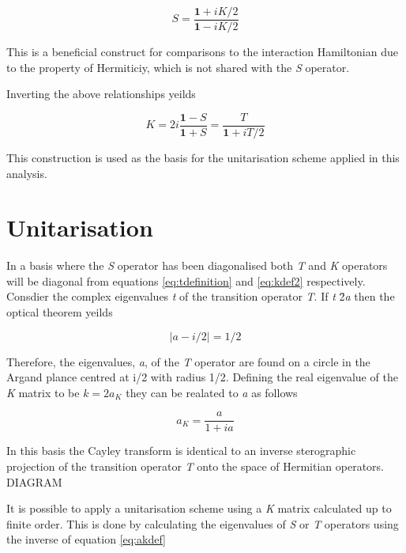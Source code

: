 \begin{equation}
  S = \frac{\textbf{1} + iK/2}{\textbf{1} - iK/2} 
  \label{eq:kdef}
\end{equation}

This is a beneficial construct for comparisons to the interaction Hamiltonian due to the property of Hermiticiy, which is not shared with the \textit{S} operator.

Inverting the above relationships yeilds

\begin{equation}
  K = 2i \frac{\textbf{1} - S}{\textbf{1} + S} = \frac{T}{\textbf{1} + iT/2}
  \label{eq:kdef2}
\end{equation}

This construction is used as the basis for the unitarisation scheme applied in this analysis.  

\section{Unitarisation}
\label{sec:unitarisation}

In a basis where the \textit{S} operator has been diagonalised both \textit{T} and \textit{K} operators will be diagonal from equations \ref{eq:tdefinition} and \ref{eq:kdef2} respectively.  Consdier the complex eigenvalues \textit{t} of the transition operator \textit{T}.  If \textit{t} \= 2\textit{a} then the optical theorem yeilds

\begin{equation}
  |a - i/2| = 1/2
  \label{eq:toperatoreval}
\end{equation}

Therefore, the eigenvalues, \textit{a}, of the \textit{T} operator are found on a circle in the Argand plance centred at i/2 with radius 1/2.  Defining the real eigenvalue of the \textit{K} matrix to be $\textit{k} = 2\textit{a}_{\textit{K}}$ they can be realated to \textit{a} as follows

\begin{equation}
  a_{K} = \frac{a}{1+ia}
  \label{eq:akdef}
\end{equation}

In this basis the Cayley transform is identical to an inverse sterographic projection of the transition operator \textit{T} onto the space of Hermitian operators.  DIAGRAM

It is possible to apply a unitarisation scheme using a \textit{K} matrix calculated up to finite order.  This is done by calculating the eigenvalues of \textit{S} or \textit{T} operators using the inverse of equation \ref{eq:akdef}


